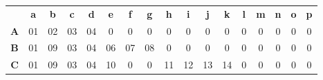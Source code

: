 \documentclass[12pt, twoside, openright]{report} %
\begin{document}
\begin{table}[H]
  \centering
  \begin{tabular}{ccccccccccccccccc}
                                  & \textbf{a}              & \textbf{b}              & \textbf{c}              & \textbf{d}              & \textbf{e}                                     & \textbf{f}                                     & \textbf{g}                                     & \textbf{h}                                     & \textbf{i}                                     & \textbf{j}                                     & \textbf{k}                                     & \textbf{l}                                     & \textbf{m}                                     & \textbf{n}                                     & \textbf{o}                                     & \textbf{p}                                     \\ \cline{2-17} 
  \multicolumn{1}{c|}{\textbf{A}} & \multicolumn{1}{c|}{01} & \multicolumn{1}{c|}{02} & \multicolumn{1}{c|}{03} & \multicolumn{1}{c|}{04} & \multicolumn{1}{c|}{\cellcolor[HTML]{C0C0C0}0} & \multicolumn{1}{c|}{\cellcolor[HTML]{C0C0C0}0} & \multicolumn{1}{c|}{\cellcolor[HTML]{C0C0C0}0} & \multicolumn{1}{c|}{\cellcolor[HTML]{C0C0C0}0} & \multicolumn{1}{c|}{\cellcolor[HTML]{C0C0C0}0} & \multicolumn{1}{c|}{\cellcolor[HTML]{C0C0C0}0} & \multicolumn{1}{c|}{\cellcolor[HTML]{C0C0C0}0} & \multicolumn{1}{c|}{\cellcolor[HTML]{C0C0C0}0} & \multicolumn{1}{c|}{\cellcolor[HTML]{C0C0C0}0} & \multicolumn{1}{c|}{\cellcolor[HTML]{C0C0C0}0} & \multicolumn{1}{c|}{\cellcolor[HTML]{C0C0C0}0} & \multicolumn{1}{c|}{\cellcolor[HTML]{C0C0C0}0} \\ \cline{2-17} 
  \multicolumn{1}{c|}{\textbf{B}} & \multicolumn{1}{c|}{01} & \multicolumn{1}{c|}{09} & \multicolumn{1}{c|}{03} & \multicolumn{1}{c|}{04} & \multicolumn{1}{c|}{06}                        & \multicolumn{1}{c|}{07}                        & \multicolumn{1}{c|}{08}                        & \multicolumn{1}{c|}{\cellcolor[HTML]{C0C0C0}0} & \multicolumn{1}{c|}{\cellcolor[HTML]{C0C0C0}0} & \multicolumn{1}{c|}{\cellcolor[HTML]{C0C0C0}0} & \multicolumn{1}{c|}{\cellcolor[HTML]{C0C0C0}0} & \multicolumn{1}{c|}{\cellcolor[HTML]{C0C0C0}0} & \multicolumn{1}{c|}{\cellcolor[HTML]{C0C0C0}0} & \multicolumn{1}{c|}{\cellcolor[HTML]{C0C0C0}0} & \multicolumn{1}{c|}{\cellcolor[HTML]{C0C0C0}0} & \multicolumn{1}{c|}{\cellcolor[HTML]{C0C0C0}0} \\ \cline{2-17} 
  \multicolumn{1}{c|}{\textbf{C}} & \multicolumn{1}{c|}{01} & \multicolumn{1}{c|}{09} & \multicolumn{1}{c|}{03} & \multicolumn{1}{c|}{04} & \multicolumn{1}{c|}{10}                        & \multicolumn{1}{c|}{\cellcolor[HTML]{C0C0C0}0} & \multicolumn{1}{c|}{\cellcolor[HTML]{C0C0C0}0} & \multicolumn{1}{c|}{11}                        & \multicolumn{1}{c|}{12}                        & \multicolumn{1}{c|}{13}                        & \multicolumn{1}{c|}{14}                        & \multicolumn{1}{c|}{\cellcolor[HTML]{C0C0C0}0} & \multicolumn{1}{c|}{\cellcolor[HTML]{C0C0C0}0} & \multicolumn{1}{c|}{\cellcolor[HTML]{C0C0C0}0} & \multicolumn{1}{c|}{\cellcolor[HTML]{C0C0C0}0} & \multicolumn{1}{c|}{\cellcolor[HTML]{C0C0C0}0} \\ \cline{2-17} 

\end{tabular}
\end{table}
\end{document}
